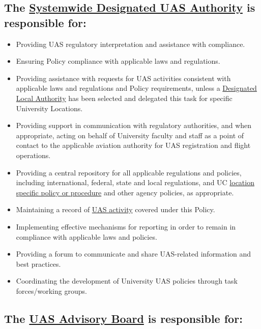 \documentclass[
]{book}
\providecommand{\tightlist}{%
  \setlength{\itemsep}{0pt}\setlength{\parskip}{0pt}}
\begin{document}
\hypertarget{the-refsda-is-responsible-for}{%
\subsection{The \protect\hyperlink{SDA}{Systemwide Designated UAS Authority} is responsible for:}\label{the-refsda-is-responsible-for}}

\begin{itemize}
\tightlist
\item
  Providing UAS regulatory interpretation and assistance with compliance.
\item
  Ensuring Policy compliance with applicable laws and regulations.
\item
  Providing assistance with requests for UAS activities consistent with applicable laws and regulations and Policy requirements, unless a \protect\hyperlink{DLA}{Designated Local Authority} has been selected and delegated this task for specific University Locations.
\item
  Providing support in communication with regulatory authorities, and when appropriate, acting on behalf of University faculty and staff as a point of contact to the applicable aviation authority for UAS registration and flight operations.
\item
  Providing a central repository for all applicable regulations and policies, including international, federal, state and local regulations, and UC \protect\hyperlink{LSP}{location specific policy or procedure} and other agency policies, as appropriate.
\item
  Maintaining a record of \protect\hyperlink{UASactivity}{UAS activity} covered under this Policy.
\item
  Implementing effective mechanisms for reporting in order to remain in compliance with applicable laws and policies.
\item
  Providing a forum to communicate and share UAS-related information and best practices.
\item
  Coordinating the development of University UAS policies through task forces/working groups.
\end{itemize}

\hypertarget{the-refab-is-responsible-for}{%
\subsection{The \protect\hyperlink{AB}{UAS Advisory Board} is responsible for:}\label{the-refab-is-responsible-for}}
\end{document}
